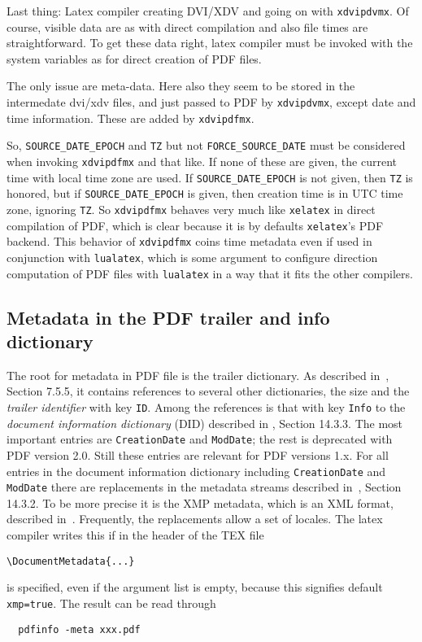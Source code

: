 \documentclass[a4paper, english]{article}%
\newcommand{\lualatex}{\texttt{lualatex}}
\newcommand{\xelatex}{\texttt{xelatex}}
\begin{document}
Last thing: 
Latex compiler creating DVI/XDV and going on with \texttt{xdvipdvmx}. 
Of course, visible data are as with direct compilation and also file times are straightforward. 
To get these data right, latex compiler must be invoked with the system variables 
as for direct creation of PDF files. 

The only issue are meta-data. 
Here also they seem to be stored in the intermedate dvi/xdv files, 
and just passed to PDF by \texttt{xdvipdvmx}, 
except date and time information. 
These are added by \texttt{xdvipdfmx}. 

So, \texttt{SOURCE\_DATE\_EPOCH} and \texttt{TZ} but not \texttt{FORCE\_SOURCE\_DATE} 
must be considered when invoking \texttt{xdvipdfmx} and that like. 
If none of these are given, the current time with local time zone are used. 
If \texttt{SOURCE\_DATE\_EPOCH} is not given, then \texttt{TZ} is honored, 
but if \texttt{SOURCE\_DATE\_EPOCH} is given, then creation time is in UTC time zone, 
ignoring \texttt{TZ}. 
So \texttt{xdvipdfmx} behaves very much like \xelatex{} in direct compilation of PDF, 
which is clear because it is by defaults \xelatex's PDF backend. 
This behavior of \texttt{xdvipdfmx} coins time metadata even if used in conjunction with \lualatex, 
which is some argument to configure direction computation of PDF files with \lualatex 
in a way that it fits the other compilers. 



\subsection{Metadata in the PDF trailer and info dictionary}\label{subsec:trailerInfoDict}

The root for metadata in PDF file is the trailer dictionary. 
As described in~\cite{Pdf20}, Section 7.5.5, 
it contains references to several other dictionaries, 
the size and the \emph{trailer identifier} with key \texttt{ID}. 
Among the references is that with key \texttt{Info} 
to the \emph{document information dictionary} (DID) described in \cite{Pdf20}, Section 14.3.3. 
The most important entries are \texttt{CreationDate} and \texttt{ModDate}; 
the rest is deprecated with PDF version 2.0. 
Still these entries are relevant for PDF versions 1.x. 
For all entries in the document information dictionary including \texttt{CreationDate} and \texttt{ModDate} 
there are replacements in the metadata streams described in~\cite{Pdf20}, Section 14.3.2. 
To be more precise it is the XMP metadata, which is an XML format, described in~\cite{ISO16684-1}. 
Frequently, the replacements allow a set of locales. 
The latex compiler writes this if in the header of the TEX file 
%
\begin{verbatim}
\DocumentMetadata{...}
\end{verbatim}
%
is specified, even if the argument list is empty, because this signifies default \texttt{xmp=true}. 
The result can be read through 
%
\begin{verbatim}
  pdfinfo -meta xxx.pdf
\end{verbatim}
\end{document}
